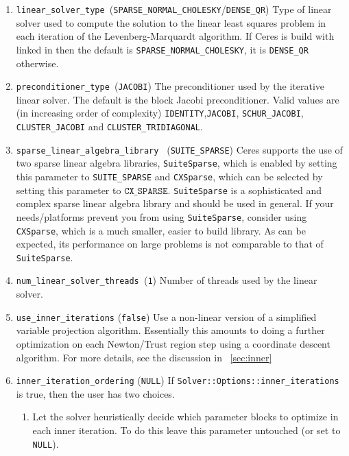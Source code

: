 \begin{enumerate}
\item{\texttt{linear\_solver\_type
    }}(\texttt{SPARSE\_NORMAL\_CHOLESKY}/\texttt{DENSE\_QR}) Type of
  linear solver used to compute the solution to the linear least
  squares problem in each iteration of the Levenberg-Marquardt
  algorithm. If Ceres is build with \suitesparse linked in  then the
  default is \texttt{SPARSE\_NORMAL\_CHOLESKY}, it is
  \texttt{DENSE\_QR} otherwise.

\item{\texttt{preconditioner\_type }}(\texttt{JACOBI}) The
  preconditioner used by the iterative linear solver. The default is
  the block Jacobi preconditioner. Valid values are (in increasing
  order of complexity) \texttt{IDENTITY},\texttt{JACOBI},
  \texttt{SCHUR\_JACOBI}, \texttt{CLUSTER\_JACOBI} and
  \texttt{CLUSTER\_TRIDIAGONAL}.

\item{\texttt{sparse\_linear\_algebra\_library }
    (\texttt{SUITE\_SPARSE})} Ceres supports the use of two sparse
  linear algebra libraries, \texttt{SuiteSparse}, which is enabled by
  setting this parameter to \texttt{SUITE\_SPARSE} and
  \texttt{CXSparse}, which can be selected by setting this parameter
  to $\texttt{CX\_SPARSE}$. \texttt{SuiteSparse} is a sophisticated
  and complex sparse linear algebra library and should be used in
  general. If your needs/platforms prevent you from using
  \texttt{SuiteSparse}, consider using \texttt{CXSparse}, which is a
  much smaller, easier to build library. As can be expected, its
  performance on large problems is not comparable to that of
  \texttt{SuiteSparse}.


\item{\texttt{num\_linear\_solver\_threads }}(\texttt{1}) Number of
  threads used by the linear solver.

\item{\texttt{use\_inner\_iterations} (\texttt{false}) } Use a
  non-linear version of a simplified variable projection
  algorithm. Essentially this amounts to doing a further optimization
  on each Newton/Trust region step using a coordinate descent
  algorithm.  For more details, see the discussion in ~\ref{sec:inner}

\item{\texttt{inner\_iteration\_ordering} (\texttt{NULL})} If
  \texttt{Solver::Options::inner\_iterations} is true, then the user
  has two choices.

\begin{enumerate}
\item Let the solver heuristically decide which parameter blocks to
  optimize in each inner iteration. To do this leave this parameter
  untouched (or set to \texttt{NULL}).


\end{enumerate}
\end{enumerate}
